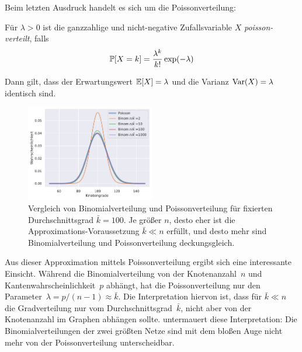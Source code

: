 \noindent
Beim letzten Ausdruck handelt es sich um die Poissonverteilung:

\begin{definition}
    Für  $\lambda > 0$ ist die ganzzahlige und nicht-negative Zufallsvariable $X$ \emph{poisson-verteilt}, falls
    \begin{align}
        \mathbb{P}\!\left[X = k\right] = \frac{\lambda ^k}{k!} \exp(-\lambda)
    \end{align}

    Dann gilt, dass der Erwartungswert $\mathbb{E}\!\left[X\right] = \lambda$ und die Varianz $\operatorname{Var}(X) = \lambda$ identisch sind.
\end{definition}

\begin{figure}
    \begin{center}
        \includegraphics[width=0.5\textwidth]{data/binom_vs_poisson.pdf}
    \end{center}
    \caption{
        Vergleich von Binomialverteilung und Poissonverteilung für fixierten Durchschnittsgrad $\bar k = 100$.
        Je größer $n$, desto eher ist die Approximations-Voraussetzung $\bar k \ll n$ erfüllt, und desto mehr sind Binomialverteilung und Poissonverteilung deckungsgleich.
    }
    \label{fig:binom_vs_poisson}
\end{figure}

\bigskip

Aus dieser Approximation mittels Poissonverteilung ergibt sich eine interessante Einsicht.
Während  die Binomialverteilung von der Knotenanzahl~$n$ und Kantenwahrscheinlichkeit~$p$ abhängt, hat die Poissonverteilung nur den Parameter~$\lambda = p / (n-1) \approx \bar k$.
Die Interpretation hiervon ist, dass für $\bar k \ll n$ die Gradverteilung nur vom Durchschnittsgrad~$\bar k$, nicht aber von der Knotenanzahl im Graphen abhängen sollte.
 untermauert diese Interpretation:
Die Binomialverteilungen der zwei größten Netze sind mit dem bloßen Auge nicht mehr von der Poissonverteilung unterscheidbar.

